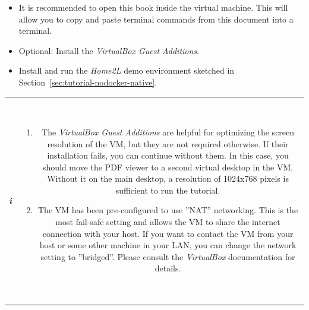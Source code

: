 \documentclass[12pt,english,parskip=half,headheight=19pt]{scrreprt}
\newcommand{\infobox}[1]{
  \par
  \medskip
  \hfill
  \setlength\arrayrulewidth{1pt}
  \begin{tabular}[t]{c|c|}
    \parbox{1.8em}{\hfill\textit{\Huge\textbf{i}\,}}
    &
    \,\parbox{0.89\linewidth}{\setlength{\parskip}{0.5em} \small #1}\,
  \end{tabular}
  \medskip
  \par
}
\newcommand{\idx}[1]{#1\index{#1}}
\newcommand{\refenv}[1]{\hyperref[env:#1]{\texttt{#1}}}        %
\begin{document}
\begin{itemize}[$\blacktriangleright$]
\item
  It is recommended to open this book inside the virtual machine.
  This will allow you to copy and paste terminal commands from this document into a terminal.

\item
  Optional: Install the \textit{VirtualBox Guest Additions}.

\item
  Install and run the \textit{Home2L} demo environment sketched in
  Section~\ref{sec:tutorial-nodocker-native}.

\end{itemize}

\infobox{
  \begin{enumerate}
    \item
      The \textit{VirtualBox Guest Additions} are helpful for optimizing the screen resolution of the
      VM, but they are not required otherwise.
      If their installation fails, you can continue without them.
      In this case, you should move the PDF viewer to a second virtual desktop in the VM.
      Without it on the main desktop, a resolution of 1024x768 pixels is sufficient to run the
      tutorial.
    \item
      The VM has been pre-configured to use ''NAT'' networking. This is the most fail-safe setting and
      allows the VM to share the internet connection with your host. If you want to contact the VM from
      your host or some other machine in your LAN, you can change the network setting to ''bridged''.
      Please consult the \textit{VirtualBox} documentation for details.
    \end{enumerate}
}





%
\end{document}
